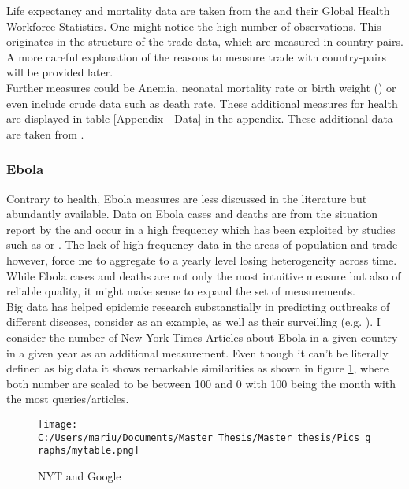 \documentclass{article}
\begin{document}
Life expectancy and mortality data are taken from the \cite{whostatistics} and their Global Health Workforce Statistics. One might notice the high number of observations. This originates in the structure of the trade data, which are measured in country pairs. A more careful explanation of the reasons to measure trade with country-pairs will be provided later. \\
Further measures could be Anemia, neonatal mortality rate or birth weight (\cite{weil2014health}) or even include crude data such as death rate. These additional measures for health are displayed in table \ref{Appendix - Data} in the appendix. These additional data are taken from \cite{wdi}.

\subsubsection{Ebola}

Contrary to health, Ebola measures are less discussed in the literature but abundantly available. Data on Ebola cases and deaths are from the situation report by the \cite{whoebola} and occur in a high frequency which has been exploited by studies such as \cite{gonzalez2017epidemics} or \cite{althaus2014estimating}. The lack of high-frequency data in the areas of population and trade however, force me to aggregate to a yearly level losing heterogeneity across time. While Ebola cases and deaths are not only the most intuitive measure but also of reliable quality, it might make sense to expand the set of measurements.\\
Big data has helped epidemic research substanstially in predicting outbreaks of different diseases, consider \cite{ginsberg2009detecting} as an example, as well as their surveilling (e.g. \cite{chan2011using}).
I consider the number of New York Times Articles about Ebola in a given country in a given year as an additional measurement. Even though it can't be literally defined as big data it shows remarkable similarities as shown in figure \ref{NYT and Google}, where both number are scaled to be between 100 and 0 with 100 being the month with the most queries/articles.

\begin{figure}[!ht]
\begin{center}\caption{ NYT and Google \label{NYT and Google}}
\texttt{[image: C:/Users/mariu/Documents/Master\_Thesis/Master\_thesis/Pics\_graphs/mytable.png]}\\
\end{center}
\end{figure}
\end{document}

